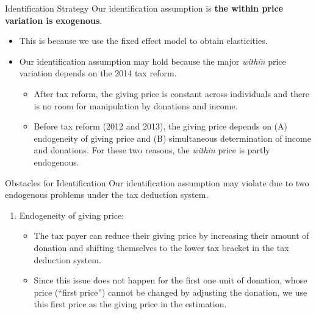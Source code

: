 \documentclass[
  ignorenonframetext,
]{beamer}
\providecommand{\tightlist}{%
  \setlength{\itemsep}{0pt}\setlength{\parskip}{0pt}}
\begin{document}
\begin{frame}{Identification Strategy}
\protect\hypertarget{identification-strategy}{}
Our identification assumption is \textbf{the within price variation is exogenous}.

\begin{itemize}
\tightlist
\item
  This is because we use the fixed effect model to obtain elasticities.
\item
  Our identification assumption may hold because the major \emph{within} price variation depends on the 2014 tax reform.

  \begin{itemize}
  \tightlist
  \item
    After tax reform, the giving price is constant across individuals and there is no room for manipulation by donations and income.
  \item
    Before tax reform (2012 and 2013), the giving price depends on (A) endogeneity of giving price and (B) simultaneous determination of income and donations. For these two reasons, the \emph{within} price is partly endogenous.
  \end{itemize}
\end{itemize}
\end{frame}

\begin{frame}{Obstacles for Identification}
\protect\hypertarget{obstacles-for-identification}{}
Our identification assumption may violate due to two endogenous problems under the tax deduction system.

\begin{enumerate}
\tightlist
\item
  Endogeneity of giving price:

  \begin{itemize}
  \tightlist
  \item
    The tax payer can reduce their giving price by increasing their amount of donation and shifting themselves to the lower tax bracket in the tax deduction system.
  \item
    Since this issue does not happen for the first one unit of donation, whose price (``first price'') cannot be changed by adjusting the donation, we use this first price as the giving price in the estimation.
  \end{itemize}
\end{enumerate}
\end{frame}
\end{document}
